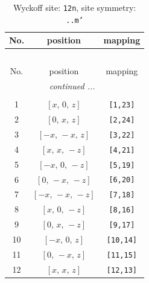 \documentclass[fleqn,8pt]{jsarticle}
\begin{document}
\begin{longtable}{ccc}
\caption{Wyckoff site: {\tt 12n}, site symmetry: {\tt ..m'}}
 \\
 \hline \hline
No. & position & mapping \\ \hline \endfirsthead

\multicolumn{2}{l}{\tablename\ \thetable{}} \\
 \hline \hline
No. & position & mapping \\ \hline \endhead

 \hline \hline
\multicolumn{2}{r}{\footnotesize\it continued ...} \\ \endfoot

 \hline \hline
\multicolumn{2}{r}{} \\ \endlastfoot

1 & $\left[ x,\, 0,\, z \right]$ & {\tt [1,23]} \\ \hline
2 & $\left[ 0,\, x,\, z \right]$ & {\tt [2,24]} \\ \hline
3 & $\left[ - x,\, - x,\, z \right]$ & {\tt [3,22]} \\ \hline
4 & $\left[ x,\, x,\, - z \right]$ & {\tt [4,21]} \\ \hline
5 & $\left[ - x,\, 0,\, - z \right]$ & {\tt [5,19]} \\ \hline
6 & $\left[ 0,\, - x,\, - z \right]$ & {\tt [6,20]} \\ \hline
7 & $\left[ - x,\, - x,\, - z \right]$ & {\tt [7,18]} \\ \hline
8 & $\left[ x,\, 0,\, - z \right]$ & {\tt [8,16]} \\ \hline
9 & $\left[ 0,\, x,\, - z \right]$ & {\tt [9,17]} \\ \hline
10 & $\left[ - x,\, 0,\, z \right]$ & {\tt [10,14]} \\ \hline
11 & $\left[ 0,\, - x,\, z \right]$ & {\tt [11,15]} \\ \hline
12 & $\left[ x,\, x,\, z \right]$ & {\tt [12,13]} \\
\end{longtable}
\renewcommand{\arraystretch}{1.2}
\end{document}
